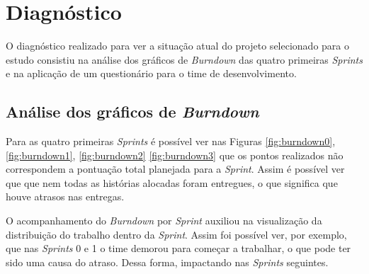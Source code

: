 	\pagebreak


\section{Diagnóstico}

	O diagnóstico realizado para ver a situação atual do projeto selecionado para o estudo consistiu na análise 
	dos gráficos de \textit{Burndown} das quatro primeiras \textit{Sprints} e na aplicação de um questionário para o 
	time de desenvolvimento.
	
	\subsection{Análise dos gráficos de \textit{Burndown}}

	Para as quatro primeiras \textit{Sprints} é possível ver nas Figuras \ref{fig:burndown0}, \ref{fig:burndown1}, \ref{fig:burndown2}
	\ref{fig:burndown3} que os pontos realizados não correspondem a pontuação total planejada para a \textit{Sprint}. 
	Assim é possível ver que que nem todas as histórias alocadas foram entregues, o que significa que houve atrasos nas entregas.

	O acompanhamento do \textit{Burndown} por \textit{Sprint} auxiliou na visualização da distribuição do trabalho dentro da \textit{Sprint}.
	Assim foi possível ver, por exemplo, que nas \textit{Sprints} 0 e 1 o time demorou para começar a trabalhar, o que pode ter sido uma causa do atraso. Dessa forma, impactando nas \textit{Sprints} seguintes.


